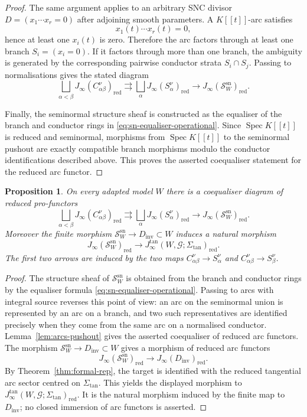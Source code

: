 \documentclass[11pt]{amsart}
\numberwithin{equation}{section}
\theoremstyle{plain}
\newtheorem{Proposition}[Theorem]{Proposition}
\theoremstyle{definition}
\newcommand{\Spec}{\operatorname{Spec}}
\newcommand{\sn}{\mathrm{sn}}
\newcommand{\Sigmatan}{\Sigma_{\mathrm{tan}}}
\newcommand{\red}{\mathrm{red}}
\newcommand{\Dinv}{D_{\mathrm{inv}}}
\newcommand{\cG}{\mathcal G}
\newcommand{\sS}{\mathscr S}
\begin{document}
\begin{proof}
The same argument applies to an arbitrary SNC divisor
$
D=(x_1\cdots x_r=0)
$
after adjoining smooth parameters.  A \(K[[t]]\)-arc satisfies
\[
x_1(t)\cdots x_r(t)=0,
\]
hence at least one \(x_i(t)\) is zero.  Therefore the arc factors through at
least one branch \(S_i=(x_i=0)\).  If it factors through more than one branch,
the ambiguity is generated by the corresponding pairwise conductor strata
\(S_i\cap S_j\).  Passing to normalisations gives the stated diagram
\[
\bigsqcup_{\alpha<\beta}J_\infty(C_{\alpha\beta}^{\nu})_{\red}
\rightrightarrows
\bigsqcup_\alpha J_\infty(S_\alpha^\nu)_{\red}
\longrightarrow
J_\infty(\sS_W^{\sn})_{\red}.
\]

Finally, the seminormal structure sheaf is constructed as the equaliser of
the branch and conductor rings in \eqref{eq:sn-equaliser-operational}.  Since
\(\Spec K[[t]]\) is reduced and seminormal, morphisms from \(\Spec K[[t]]\)
to the seminormal pushout are exactly compatible branch morphisms modulo the
conductor identifications described above.  This proves the asserted
coequaliser statement for the reduced arc functor.
\end{proof}
\begin{Proposition}
\label{prop:tangential-reduction-diagram}
On every adapted model $W$ there is a coequaliser diagram of reduced pro-functors
\[
\bigsqcup_{\alpha<\beta}J_\infty(C_{\alpha\beta}^\nu)_{\red}
\rightrightarrows
\bigsqcup_{\alpha}J_\infty(S_\alpha^\nu)_{\red}
\longrightarrow J_\infty(\sS_W^{\sn})_{\red}.
\]
Moreover the finite morphism $\sS_W^{\sn}\to \Dinv\subset W$ induces a natural morphism
\[
J_\infty(\sS_W^{\sn})_{\red}
\longrightarrow
J_\infty^{\tan}(W,\cG;\Sigmatan)_{\red}.
\]
The first two arrows are induced by the two maps $C_{\alpha\beta}^\nu\to S_\alpha^\nu$ and $C_{\alpha\beta}^\nu\to S_\beta^\nu$.
\end{Proposition}

\begin{proof}
The structure sheaf of $\sS_W^{\sn}$ is obtained from the branch and conductor rings by the equaliser formula \eqref{eq:sn-equaliser-operational}.  Passing to arcs with integral source reverses this point of view: an arc on the seminormal union is represented by an arc on a branch, and two such representatives are identified precisely when they come from the same arc on a normalised conductor.  Lemma~\ref{lem:arcs-pushout} gives the asserted coequaliser of reduced arc functors.
The morphism $\sS_W^{\sn}\to \Dinv\subset W$ gives a morphism of reduced arc functors
\[
J_\infty(\sS_W^{\sn})_{\red}\longrightarrow J_\infty(\Dinv)_{\red}.
\]
By Theorem~\ref{thm:formal-rep}, the target is identified with the reduced tangential arc sector centred on $\Sigmatan$.  This yields the displayed morphism to $J_\infty^{\tan}(W,\cG;\Sigmatan)_{\red}$.  It is the natural morphism induced by the finite map to $\Dinv$; no closed immersion of arc functors is asserted.
\end{proof}
\end{document}
